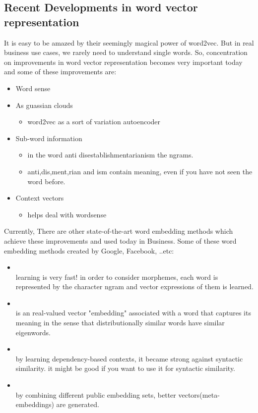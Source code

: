\subsection{Recent Developments in word vector representation}
It is easy to be amazed by their seemingly magical power of word2vec. But in real business use cases, we rarely need to understand single words. So, concentration on improvements in word vector representation  becomes very important today and some of these improvements are:
\begin{itemize}
    \item Word sense
    \item As guassian clouds
       \begin{itemize}
              \item word2vec as a sort of variation autoencoder
       \end{itemize}
    \item Sub-word information
        \begin{itemize}
              \item in the word anti disestablishmentarianism the ngrams.
              \item anti,dis,ment,rian and ism contain meaning, even if you have not seen the word before.
       \end{itemize}
    \item Context vectors
       \begin{itemize}
             \item helps deal with wordsense
      \end{itemize}
\end{itemize}
 Currently, There are other state-of-the-art word embedding methods which achieve these improvements and used today in Business. Some of these word embedding methods created by Google, Facebook, ..etc:
 \begin{itemize}
     \item \textcite{fastText}\\
     learning is very fast! in order to consider morphemes, each word is represented by the character ngram and vector expressions of them is learned.
     \item \textcite{Eigenword}\\
     is an real-valued vector "embedding" associated with a word that captures its meaning in the sense that distributionally similar words have similar eigenwords.
     
     \item \textcite{Dependency-Based Word Embeddings}\\
      by learning dependency-based contexts, it became strong against syntactic similarity. it might be good if you want to use it for syntactic similarity.
      
      \item \textcite{ Meta-embedding}\\
     by combining different public embedding sets, better vectors(meta-embeddings) are generated\cite{DBLP:conf/acl/YinS16}.
 \end{itemize} 









  


